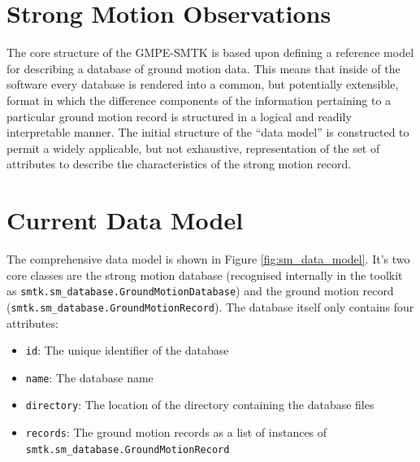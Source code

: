 \section{Strong Motion Observations}
\label{sec:data_model}

The core structure of the GMPE-SMTK is based upon defining a reference model for describing a database of ground motion data. This means that inside of the software every database is rendered into a common, but potentially extensible, format in which the difference components of the information pertaining to a particular ground motion record is structured in a logical and readily interpretable manner. The initial structure of the ``data model'' is constructed to permit a widely applicable, but not exhaustive, representation of the set of attributes to describe the characteristics of the strong motion record. 

\section{Current Data Model}

The comprehensive data model is shown in Figure \ref{fig:sm_data_model}. It's two core classes are the strong motion database (recognised internally in the toolkit as \verb=smtk.sm_database.GroundMotionDatabase=) and the ground motion record (\verb=smtk.sm_database.GroundMotionRecord=). The database itself only contains four attributes:

\begin{itemize}
\item \verb=id=: The unique identifier of the database
\item \verb=name=: The database name
\item \verb=directory=: The location of the directory containing the database files
\item \verb=records=: The ground motion records as a list of instances of\\\verb=smtk.sm_database.GroundMotionRecord=
\end{itemize}


